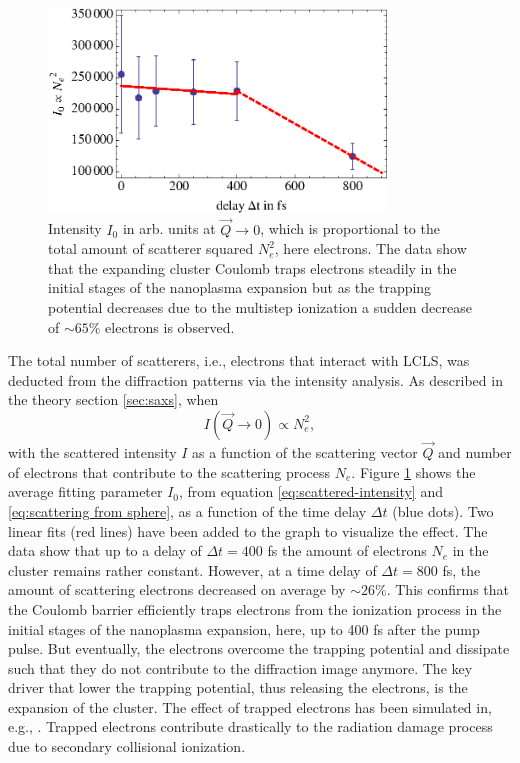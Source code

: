 \begin{figure}
	\centering
		\includegraphics[width=0.80\textwidth]{images/results/number-of-scatterer.eps}
	\caption[Time-resoved reduction of number of scatterer due to nanoplasma expansion]{Intensity $I_{0}$ in arb. units at $\vec{Q}\rightarrow 0$, which is proportional to the total amount of scatterer squared $N_{e}^{2}$, here electrons. The data show that the expanding cluster Coulomb traps electrons steadily in the initial stages of the nanoplasma expansion but as the trapping potential decreases due to the multistep ionization a sudden decrease of $\sim 65\%$ electrons is observed.}
	\label{fig:number-of-scatterer}
\end{figure}
The total number of scatterers, i.e., electrons that interact with LCLS, was deducted from the diffraction patterns via the intensity analysis. As described in the theory section \ref{sec:saxs}, when
\begin{equation}
I\left(\vec{Q}\rightarrow 0\right)\propto N_{e}^{2},
\label{eq:}
\end{equation}
with the scattered intensity $I$ as a function of the scattering vector $\vec{Q}$ and number of electrons that contribute to the scattering process $N_{e}$. Figure \ref{fig:number-of-scatterer} shows the average fitting parameter $I_{0}$, from equation \eqref{eq:scattered-intensity} and \eqref{eq:scattering from sphere}, as a function of the time delay $\Delta t$ (blue dots). Two linear fits (red lines) have been added to the graph to visualize the effect. The data show that up to a delay of $\Delta t=400$ fs the amount of electrons $N_{e}$ in the cluster remains rather constant. However, at a time delay of $\Delta t=800$ fs, the amount of scattering electrons decreased on average by $\sim 26 \%$. This confirms that the Coulomb barrier efficiently traps electrons from the ionization process in the initial stages of the nanoplasma expansion, here, up to 400 fs after the pump pulse. But eventually, the electrons overcome the trapping potential and dissipate such that they do not contribute to the diffraction image anymore. The key driver that lower the trapping potential, thus releasing the electrons, is the expansion of the cluster. The effect of trapped electrons has been simulated in, e.g., \citep{Hau-Riege-2004-PRE}. Trapped electrons contribute drastically to the radiation damage process due to secondary collisional ionization.\\
